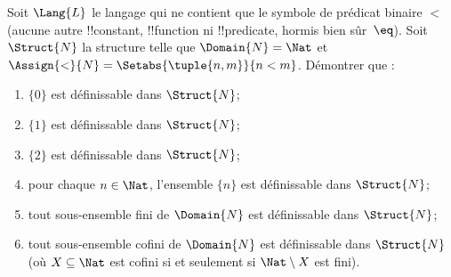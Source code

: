 \documentclass[../../../include/open-logic-section]{subfiles}
\begin{document}
\begin{prob}
Soit $\Lang{L}$ le langage qui ne contient que le symbole de
prédicat binaire $<$ (aucune autre !!{constant}, !!{function} ni
!!{predicate}, hormis bien sûr~$\eq$). Soit $\Struct{N}$ la
structure telle que $\Domain{N} = \Nat$ et
$\Assign{<}{N} = \Setabs{\tuple{n,m}}{n < m}$. Démontrer que :
\begin{enumerate}
\item $\{ 0 \}$ est définissable dans $\Struct{N}$;
\item $\{ 1 \}$ est définissable dans $\Struct{N}$;
\item $\{ 2 \}$ est définissable dans $\Struct{N}$;
\item pour chaque $n \in \Nat$, l'ensemble $\{ n \}$ est
  définissable dans $\Struct{N}$;
\item tout sous-ensemble fini de $\Domain{N}$ est définissable dans
  $\Struct{N}$;
\item tout sous-ensemble cofini de $\Domain{N}$ est définissable
  dans $\Struct{N}$ (où $X \subseteq \Nat$ est cofini si et
  seulement si $\Nat \setminus X$ est fini).
\end{enumerate}
\end{prob}
\end{document}
